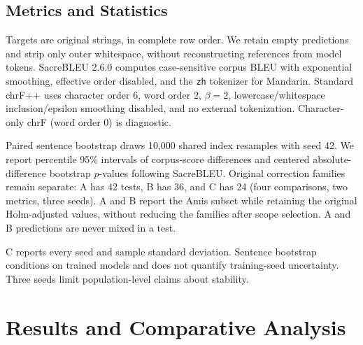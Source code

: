 \documentclass[11pt]{article}
\begin{document}
\subsection{Metrics and Statistics}
\label{sec:metrics}
Targets are original strings, in complete row order. We retain empty predictions and strip only outer whitespace, without reconstructing references from model tokens. SacreBLEU 2.6.0 computes case-sensitive corpus BLEU with exponential smoothing, effective order disabled, and the \texttt{zh} tokenizer for Mandarin. Standard chrF++ uses character order 6, word order 2, $\beta=2$, lowercase/whitespace inclusion/epsilon smoothing disabled, and no external tokenization. Character-only chrF (word order 0) is diagnostic.

Paired sentence bootstrap draws 10,000 shared index resamples with seed 42. We report percentile 95\% intervals of corpus-score differences and centered absolute-difference bootstrap $p$-values following SacreBLEU. Original correction families remain separate: A has 42 tests, B has 36, and C has 24 (four comparisons, two metrics, three seeds). A and B report the Amis subset while retaining the original Holm-adjusted values, without reducing the families after scope selection. A and B predictions are never mixed in a test.

C reports every seed and sample standard deviation. Sentence bootstrap conditions on trained models and does not quantify training-seed uncertainty. Three seeds limit population-level claims about stability.

\section{Results and Comparative Analysis}
\end{document}
